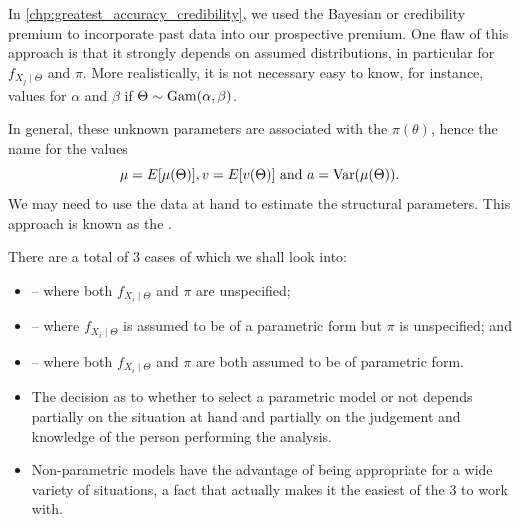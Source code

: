 \documentclass[notoc,notitlepage]{tufte-book}
\begin{document}
In \cref{chp:greatest_accuracy_credibility}, we used the Bayesian or
credibility premium to incorporate past data into our prospective premium.
One flaw of this approach is that it strongly depends on assumed distributions,
in particular for $f_{X_j \mid \Theta}$ and $\pi$.
More realistically, it is not necessary easy to know, for instance,
values for $\alpha$ and $\beta$ if $\Theta \sim \operatorname{Gam}(\alpha, \beta)$.

In general, these unknown parameters are associated with the  $\pi(\theta)$, hence the name  for the
values
\begin{equation*}
  \mu = E[\mu(\Theta)], v = E[v(\Theta)] \text{ and } a = \operatorname{Var}(\mu(\Theta)).
\end{equation*}
We may need to use the data at hand to estimate the structural parameters.
This approach is known as the .

There are a total of 3 cases of which we shall look into:
\begin{itemize}
  \item {}
    -- where both $f_{X_i \mid \Theta}$ and $\pi$ are unspecified;
  \item {}
    -- where $f_{X_i \mid \Theta}$ is assumed to be of a parametric form but
    $\pi$ is unspecified; and
  \item {}
    -- where both $f_{X_i \mid \Theta}$ and $\pi$ are both assumed to be of
    parametric form.
\end{itemize}

\begin{note}
  \begin{itemize}
    \item The decision as to whether to select a parametric model or not
      depends partially on the situation at hand
      and partially on the judgement and knowledge
      of the person performing the analysis.

    \item Non-parametric models have the advantage of being appropriate
      for a wide variety of situations, a fact that actually makes it
      the easiest of the 3 to work with.
  \end{itemize}
\end{note}
\end{document}
